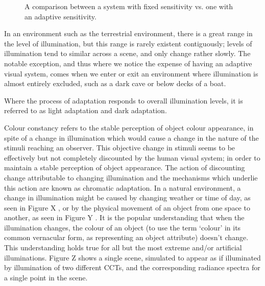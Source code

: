 \begin{figure}[htbp]
\caption{A comparison between a system with fixed sensitivity vs. one with an adaptive sensitivity.}
\label{fig:adaptation}
\end{figure}

In an environment such as the terrestrial environment, there is a great range in the level of illumination, but this range is rarely existent contiguously; levels of illumination tend to similar across a scene, and only change rather slowly. The notable exception, and thus where we notice the expense of having an adaptive visual system, comes when we enter or exit an environment where illumination is almost entirely excluded, such as a dark cave or below decks of a boat. 

Where the process of adaptation responds to overall illumination levels, it is referred to as light adaptation and dark adaptation. 


Colour constancy refers to the stable perception of object colour appearance, in spite of a change in illumination which would cause a change in the nature of the stimuli reaching an observer. This objective change in stimuli seems to be effectively but not completely discounted by the human visual system; in order to maintain a stable perception of object appearance. The action of discounting change attributable to changing illumination and the mechanisms which underlie this action are known as chromatic adaptation. 
In a natural environment, a change in illumination might be caused by changing weather or time of day, as seen in Figure X%
, or by the physical movement of an object from one space to another, as seen in Figure Y%
. It is the popular understanding that when the illumination changes, the colour of an object (to use the term `colour' in its common vernacular form, as representing an object attribute) doesn't change. This understanding holds true for all but the most extreme and/or artificial illuminations. Figure Z%
shows a single scene, simulated to appear as if illuminated by illumination of two different \glspl{CCT}, and the corresponding radiance spectra for a single point in the scene.


